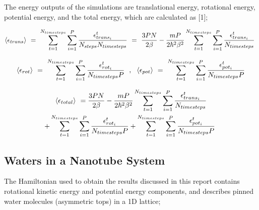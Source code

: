 \documentclass[11pt]{article}
\begin{document}
The energy outputs of the simulations are translational energy, rotational energy, potential energy, and the total energy, which are calculated as [1];

\begin{equation} 
\langle \epsilon_{trans} \rangle \hspace{0.125cm} = \hspace{0.125cm} \sum_{t = 1}^{N_{timesteps}} \sum_{i = 1}^{P} \frac{\epsilon_{trans_i}^t}{N_{steps} N_{timesteps}} \hspace{0.125cm} = \hspace{0.125cm} \frac{3 P N }{2 \beta} - \frac{mP}{2 \hbar^2 \beta^2} \sum_{t = 1}^{N_{timesteps}} \sum_{i = 1}^{P} \frac{\epsilon_{trans_i}^t}{N_{timesteps}} \hspace{0.125cm} 
\end{equation}

\begin{equation} 
\langle \epsilon_{rot} \rangle \hspace{0.125cm} = \hspace{0.125cm} \sum_{t = 1}^{N_{timesteps}} \sum_{i = 1}^{P} \frac{\epsilon_{rot_i}^t}{N_{timesteps} P} \hspace{0.225cm} , \hspace{0.225cm} \langle \epsilon_{pot} \rangle \hspace{0.125cm} = \hspace{0.125cm} \sum_{t = 1}^{N_{timesteps}} \sum_{i = 1}^{P} \frac{\epsilon_{pot_i}^t}{N_{timesteps} P}
\end{equation}

\begin{multline*}
\langle \epsilon_{total} \rangle \hspace{0.125cm} = \frac{3 P N }{2 \beta} - \frac{mP}{2 \hbar^2 \beta^2} \sum_{t = 1}^{N_{timesteps}} \sum_{i = 1}^{P} \frac{\epsilon_{trans_i}^t}{N_{timesteps}} \\ + \sum_{t = 1}^{N_{timesteps}} \sum_{i = 1}^{P} \frac{\epsilon_{rot_i}^t}{N_{timesteps} P} + \sum_{t = 1}^{N_{timesteps}} \sum_{i = 1}^{P} \frac{\epsilon_{pot_i}^t}{N_{timesteps} P} \hspace{0.125cm} 
\end{multline*}

\subsection{Waters in a Nanotube System} 

The Hamiltonian used to obtain the results discussed in this report contains rotational kinetic energy and potential energy components, and describes pinned water molecules (asymmetric tops) in a 1D lattice;
\end{document}
